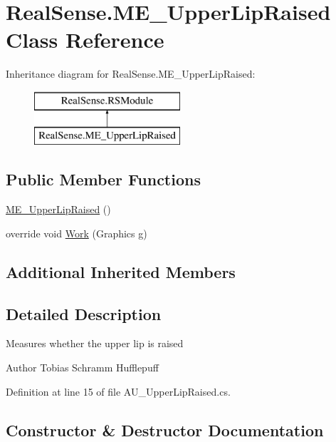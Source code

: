 \hypertarget{class_real_sense_1_1_m_e___upper_lip_raised}{}\section{Real\+Sense.\+M\+E\+\_\+\+Upper\+Lip\+Raised Class Reference}
\label{class_real_sense_1_1_m_e___upper_lip_raised}
Inheritance diagram for Real\+Sense.\+M\+E\+\_\+\+Upper\+Lip\+Raised\+:\begin{figure}[H]
\begin{center}
\leavevmode
\includegraphics[height=2.000000cm]{class_real_sense_1_1_m_e___upper_lip_raised}
\end{center}
\end{figure}
\subsection*{Public Member Functions}
\begin{DoxyCompactItemize}
\item 
\hyperlink{class_real_sense_1_1_m_e___upper_lip_raised_a73b1c6a7fbdb6d13ba2a7a37aa66d2b6}{M\+E\+\_\+\+Upper\+Lip\+Raised} ()
\item 
override void \hyperlink{class_real_sense_1_1_m_e___upper_lip_raised_a6976e114c500d0adbbd68a52ae5eae63}{Work} (Graphics g)
\end{DoxyCompactItemize}
\subsection*{Additional Inherited Members}


\subsection{Detailed Description}
Measures whether the upper lip is raised \begin{DoxyAuthor}{Author}
Tobias Schramm  Hufflepuff 
\end{DoxyAuthor}


Definition at line 15 of file A\+U\+\_\+\+Upper\+Lip\+Raised.\+cs.



\subsection{Constructor \& Destructor Documentation}
\mbox{\label{class_real_sense_1_1_m_e___upper_lip_raised_a73b1c6a7fbdb6d13ba2a7a37aa66d2b6}} 
